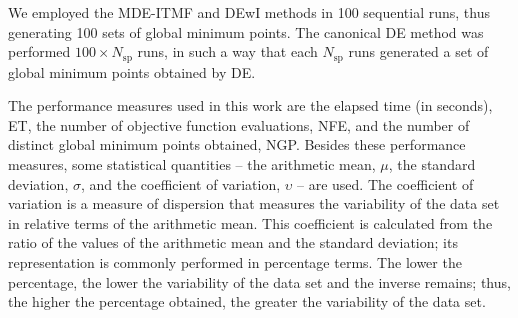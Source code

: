 \documentclass[smallextended]{svjour3}       %
\begin{document}
\begin{table}[!htb]
\centering{}
\caption{Benchmark functions, domains and \# of minimizers}
\label{tab:bench_funct}
\end{table}

We employed the MDE-ITMF and DEwI methods in 100 sequential runs, thus generating 100 sets of global minimum points. The canonical DE method was performed $100 \times N_{\text{sp}}$ runs, in such a way that each $N_{\text{sp}}$ runs generated a set of global minimum points obtained by DE.

The performance measures used in this work are the elapsed time (in seconds), ET, the number of objective function evaluations, NFE, and the number of distinct global minimum points obtained, NGP. Besides these performance measures, some statistical quantities -- the arithmetic mean, $\mu$, the standard deviation, $\sigma$, and the coefficient of variation, $\upsilon$ -- are used. The coefficient of variation is a measure of dispersion that measures the variability of the data set in relative terms of the arithmetic mean. This coefficient is calculated from the ratio of the values of the arithmetic mean and the standard deviation; its representation is commonly performed in percentage terms. The lower the percentage, the lower the variability of the data set and the inverse remains; thus, the higher the percentage obtained, the greater the variability of the data set.
\end{document}

